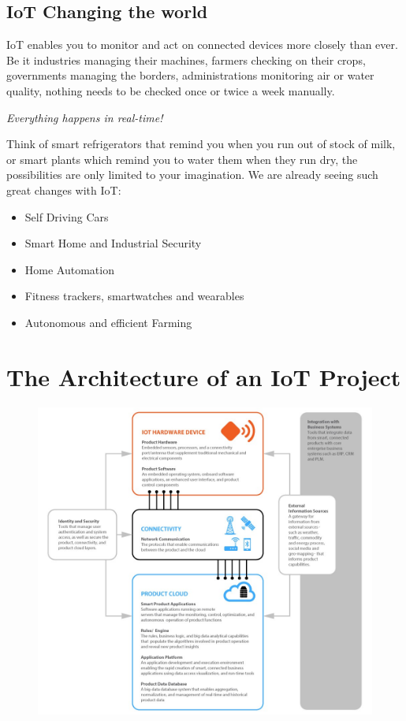 \documentclass[12pt]{report}
\begin{document}
\section{IoT Changing the world}
IoT enables you to monitor and act on connected devices more closely than ever. Be it industries managing their machines, farmers checking on their crops, governments managing the borders, administrations monitoring air or water quality, nothing needs to be checked once or twice a week manually.

\textit{Everything happens in real-time!}

Think of smart refrigerators that remind you when you run out of stock of milk, or smart plants which remind you to water them when they run dry, the possibilities are only limited to your imagination.
We are already seeing such great changes with IoT:

\begin{itemize}
    \item Self Driving Cars
    \item Smart Home and Industrial Security
    \item Home Automation
    \item Fitness trackers, smartwatches and wearables
    \item Autonomous and efficient Farming
\end{itemize}

\chapter{The Architecture of an IoT Project}

\begin{figure}
    \centering
    \includegraphics[trim={1cm, 0cm, 0cm, 0cm}, width=18cm, clip]{figs/iot_arch.jpeg}
\end{figure}
\end{document}
